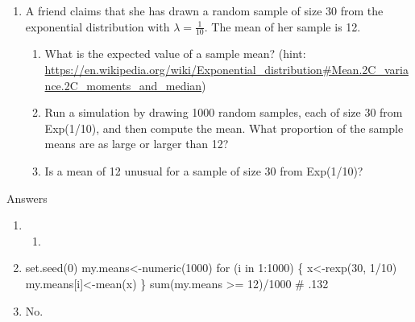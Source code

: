 \documentclass[]{article}
\providecommand{\tightlist}{%
  \setlength{\itemsep}{0pt}\setlength{\parskip}{0pt}}
\begin{document}
\newpage

\begin{enumerate}
\def\labelenumi{\arabic{enumi}.}
\setcounter{enumi}{1}
\item
  A friend claims that she has drawn a random sample of size 30 from the
  exponential distribution with \(\lambda = \frac{1}{10}\). The mean of
  her sample is 12.

  \begin{enumerate}
  \def\labelenumii{\alph{enumii}.}
  \tightlist
  \item
    What is the expected value of a sample mean? (hint:
    \url{https://en.wikipedia.org/wiki/Exponential_distribution\#Mean.2C_variance.2C_moments_and_median})
  \item
    Run a simulation by drawing 1000 random samples, each of size 30
    from Exp(1/10), and then compute the mean. What proportion of the
    sample means are as large or larger than 12?
  \item
    Is a mean of 12 unusual for a sample of size 30 from Exp(1/10)?
  \end{enumerate}
\end{enumerate}

Answers

\begin{enumerate}
\def\labelenumi{(\alph{enumi})}
\item
  \begin{enumerate}
  \def\labelenumii{\arabic{enumii}.}
  \setcounter{enumii}{9}
  \item
  \end{enumerate}
\item
  set.seed(0) my.means\textless{}-numeric(1000) for (i in 1:1000) \{
  x\textless{}-rexp(30, 1/10) my.means{[}i{]}\textless{}-mean(x) \}
  sum(my.means \textgreater{}= 12)/1000 \# .132
\item
  No.
\end{enumerate}
\end{document}
